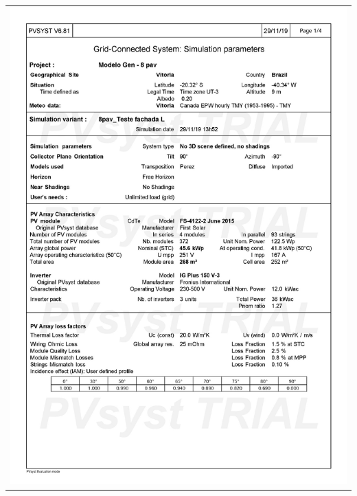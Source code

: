\begin{table}[H]
    \centering
    \begin{tabular}{l}
        \includegraphics[width=\textwidth]{figures/attachments/resultpv3.jpg}
    \end{tabular}
\end{table}
\pagebreak

